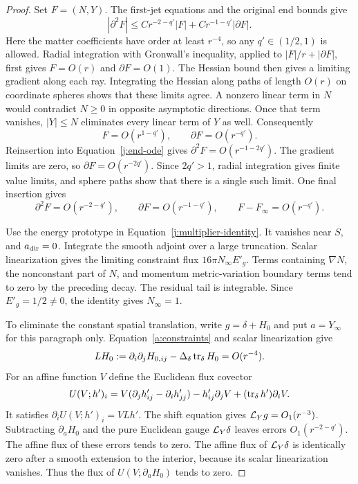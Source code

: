\begin{proof}
Set \(F=(N,Y)\). The first-jet equations and the original end bounds give
\begin{equation}
\label{j:end-ode}
 |\partial^2F|
 \leq C r^{-2-q'}|F|+C r^{-1-q'}|\partial F|.
\end{equation}
Here the matter coefficients have order at least \(r^{-4}\), so any
\(q'\in(1/2,1)\) is allowed. Radial integration with Gronwall's inequality,
applied to \(|F|/r+|\partial F|\), first gives
\(F=O(r)\) and \(\partial F=O(1)\).
The Hessian bound then gives a limiting gradient along each ray.
Integrating the Hessian along paths of length \(O(r)\) on coordinate
spheres shows that these limits agree. A nonzero linear term in \(N\)
would contradict \(N\geq0\) in opposite asymptotic directions. Once that
term vanishes, \(|Y|\leq N\) eliminates every linear term of \(Y\) as
well. Consequently
\[
 F=O(r^{1-q'}),\qquad \partial F=O(r^{-q'}).
\]
Reinsertion into Equation~\eqref{j:end-ode} gives
\(\partial^2F=O(r^{-1-2q'})\). The gradient limits are zero, so
\(\partial F=O(r^{-2q'})\). Since \(2q'>1\), radial integration gives
finite value limits, and sphere paths show that there is a single such
limit. One final insertion gives
\[
 \partial^2F=O(r^{-2-q'}),\qquad
 \partial F=O(r^{-1-q'}),\qquad
 F-F_\infty=O(r^{-q'}).
\]

Use the energy prototype in Equation~\eqref{j:multiplier-identity}.
It vanishes near \(S\), and \(a_{\rm dir}=0\). Integrate the smooth
adjoint over a large truncation. Scalar linearization gives the limiting
constraint flux \(16\pi N_\infty E'_g\). Terms containing \(\nabla N\),
the nonconstant part of \(N\), and momentum metric-variation boundary
terms tend to zero by the preceding decay. The residual tail is
integrable. Since \(E'_g=1/2\neq0\), the identity gives \(N_\infty=1\).

To eliminate the constant spatial translation, write
\(g=\delta+H_0\) and put \(a=Y_\infty\) for this paragraph only.
Equation~\eqref{a:constraints} and scalar linearization give
\[
 LH_0:=\partial_i\partial_jH_{0,ij}
                   -\Delta_\delta\operatorname{tr}_\delta H_0=O(r^{-4}).
\]
For an affine function \(V\) define the Euclidean flux covector
\[
 U(V;h')_i=
 V(\partial_jh'_{ij}-\partial_ih'_{jj})
       -h'_{ij}\partial_jV+(\operatorname{tr}_\delta h')\partial_iV.
\]
It satisfies \(\partial_iU(V;h')_i=VLh'\).
The shift equation gives \(\mathcal L_Yg=O_1(r^{-3})\). Subtracting
\(\partial_aH_0\) and the pure Euclidean gauge \(\mathcal L_Y\delta\)
leaves errors \(O_1(r^{-2-q'})\). The affine flux of these errors tends
to zero. The affine flux of \(\mathcal L_Y\delta\) is identically zero after a
smooth extension to the interior, because its scalar linearization
vanishes. Thus the flux of \(U(V;\partial_aH_0)\) tends to zero.


\end{proof}
